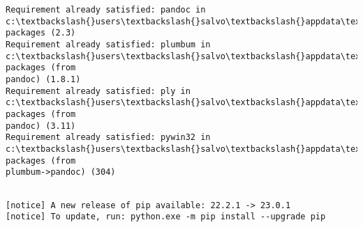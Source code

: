 \documentclass[11pt]{article}
\makeatletter
\newcommand{\boxspacing}{\kern\kvtcb@left@rule\kern\kvtcb@boxsep}
\newcommand{\prompt}[4]{
        {\ttfamily\llap{{\color{#2}[#3]:\hspace{3pt}#4}}\vspace{-\baselineskip}}
    }
\makeatother
\begin{document}
    \begin{Verbatim}[commandchars=\\\{\}]
Requirement already satisfied: pandoc in
c:\textbackslash{}users\textbackslash{}salvo\textbackslash{}appdata\textbackslash{}local\textbackslash{}programs\textbackslash{}python\textbackslash{}python310\textbackslash{}lib\textbackslash{}site-packages (2.3)
Requirement already satisfied: plumbum in
c:\textbackslash{}users\textbackslash{}salvo\textbackslash{}appdata\textbackslash{}local\textbackslash{}programs\textbackslash{}python\textbackslash{}python310\textbackslash{}lib\textbackslash{}site-packages (from
pandoc) (1.8.1)
Requirement already satisfied: ply in
c:\textbackslash{}users\textbackslash{}salvo\textbackslash{}appdata\textbackslash{}local\textbackslash{}programs\textbackslash{}python\textbackslash{}python310\textbackslash{}lib\textbackslash{}site-packages (from
pandoc) (3.11)
Requirement already satisfied: pywin32 in
c:\textbackslash{}users\textbackslash{}salvo\textbackslash{}appdata\textbackslash{}local\textbackslash{}programs\textbackslash{}python\textbackslash{}python310\textbackslash{}lib\textbackslash{}site-packages (from
plumbum->pandoc) (304)
    \end{Verbatim}

    \begin{Verbatim}[commandchars=\\\{\}]

[notice] A new release of pip available: 22.2.1 -> 23.0.1
[notice] To update, run: python.exe -m pip install --upgrade pip
    \end{Verbatim}

    \begin{tcolorbox}[breakable, size=fbox, boxrule=1pt, pad at break*=1mm,colback=cellbackground, colframe=cellborder]
\prompt{In}{incolor}{ }{\boxspacing}
\begin{Verbatim}[commandchars=\\\{\}]

\end{Verbatim}
\end{tcolorbox}


    
    
    
\end{document}

